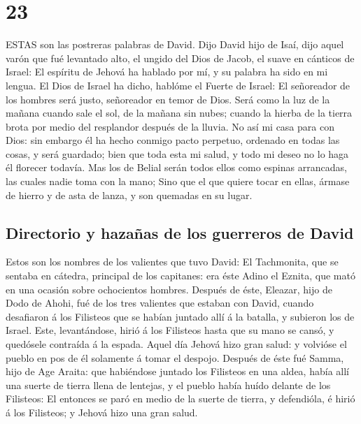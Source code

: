 \hypertarget{section-22}{%
\section{23}\label{section-22}}

 ESTAS son las postreras palabras de David. Dijo David hijo
de Isaí, dijo aquel varón que fué levantado alto, el ungido del Dios de
Jacob, el suave en cánticos de Israel:  El espíritu de
Jehová ha hablado por mí, y su palabra ha sido en mi lengua.
 El Dios de Israel ha dicho, hablóme el Fuerte de Israel: El
señoreador de los hombres será justo, señoreador en temor de Dios.
 Será como la luz de la mañana cuando sale el sol, de la
mañana sin nubes; cuando la hierba de la tierra brota por medio del
resplandor después de la lluvia.  No así mi casa para con
Dios: sin embargo él ha hecho conmigo pacto perpetuo, ordenado en todas
las cosas, y será guardado; bien que toda esta mi salud, y todo mi deseo
no lo haga él florecer todavía.  Mas los de Belial serán
todos ellos como espinas arrancadas, las cuales nadie toma con la mano;
 Sino que el que quiere tocar en ellas, ármase de hierro y
de asta de lanza, y son quemadas en su lugar.

\hypertarget{directorio-y-hazauxf1as-de-los-guerreros-de-david}{%
\subsection{Directorio y hazañas de los guerreros de
David}\label{directorio-y-hazauxf1as-de-los-guerreros-de-david}}

 Estos son los nombres de los valientes que tuvo David: El
Tachmonita, que se sentaba en cátedra, principal de los capitanes: era
éste Adino el Eznita, que mató en una ocasión sobre ochocientos hombres.
 Después de éste, Eleazar, hijo de Dodo de Ahohi, fué de los
tres valientes que estaban con David, cuando desafiaron á los Filisteos
que se habían juntado allí á la batalla, y subieron los de Israel.
 Este, levantándose, hirió á los Filisteos hasta que su
mano se cansó, y quedósele contraída á la espada. Aquel día Jehová hizo
gran salud: y volvióse el pueblo en pos de él solamente á tomar el
despojo.  Después de éste fué Samma, hijo de Age Araita:
que habiéndose juntado los Filisteos en una aldea, había allí una suerte
de tierra llena de lentejas, y el pueblo había huído delante de los
Filisteos:  El entonces se paró en medio de la suerte de
tierra, y defendióla, é hirió á los Filisteos; y Jehová hizo una gran
salud.

